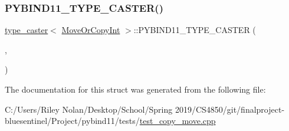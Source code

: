 \subsubsection{\texorpdfstring{PYBIND11\_TYPE\_CASTER()}{PYBIND11\_TYPE\_CASTER()}}
{\footnotesize\ttfamily \mbox{\hyperlink{classtype__caster}{type\+\_\+caster}}$<$ \mbox{\hyperlink{class_move_or_copy_int}{Move\+Or\+Copy\+Int}} $>$\+::P\+Y\+B\+I\+N\+D11\+\_\+\+T\+Y\+P\+E\+\_\+\+C\+A\+S\+T\+ER (\begin{DoxyParamCaption}\item[{\mbox{\hyperlink{class_move_or_copy_int}{Move\+Or\+Copy\+Int}}}]{,  }\item[{\mbox{\hyperlink{descr_8h_af114703e20c6527e87163eb2798f74b8}{\+\_\+}}(\char`\"{}Move\+Or\+Copy\+Int\char`\"{})}]{ }\end{DoxyParamCaption})}



The documentation for this struct was generated from the following file\+:\begin{DoxyCompactItemize}
\item 
C\+:/\+Users/\+Riley Nolan/\+Desktop/\+School/\+Spring 2019/\+C\+S4850/git/finalproject-\/bluesentinel/\+Project/pybind11/tests/\mbox{\hyperlink{test__copy__move_8cpp}{test\+\_\+copy\+\_\+move.\+cpp}}\end{DoxyCompactItemize}
